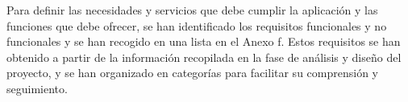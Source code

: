 Para definir las necesidades y servicios que debe cumplir la aplicación y las funciones que debe ofrecer, se han identificado los requisitos funcionales y no funcionales y se han recogido en una lista en el Anexo f. Estos requisitos se han obtenido a partir de la información recopilada en la fase de análisis y diseño del proyecto, y se han organizado en categorías para facilitar su comprensión y seguimiento.